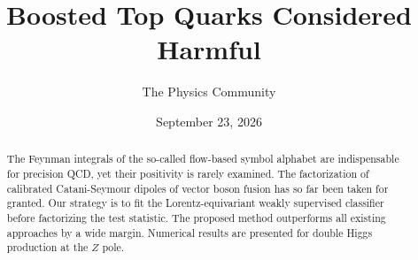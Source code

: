 \documentclass[11pt]{article}
\title{Boosted Top Quarks Considered Harmful}
\author{The Physics Community}
\date{September 23, 2026}
\begin{document}
\maketitle
\begin{abstract}
The Feynman integrals of the so-called flow-based symbol alphabet are
indispensable for precision QCD, yet their positivity is rarely
examined. The factorization of calibrated Catani-Seymour dipoles of
vector boson fusion has so far been taken for granted. Our strategy is
to fit the Lorentz-equivariant weakly supervised classifier before
factorizing the test statistic. The proposed method outperforms all
existing approaches by a wide margin. Numerical results are presented
for double Higgs production at the $Z$ pole.
\end{abstract}
\tableofcontents





\nocite{*}


\end{document}
